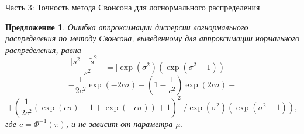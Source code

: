 \documentclass[ucs, notheorems, handout]{beamer}
\newtheorem{proposition2}[theorem]{Предложение}
\begin{document}
	\begin{frame}{Часть 3: Точность метода Свонсона для логнормального распределения}
		\begin{proposition2}\label{pr6}
			Ошибка аппроксимации дисперсии логнормального распределения по методу Свонсона, выведенному для аппроксимации нормального распределения, равна
			\[\dfrac{\mid s^{2} - \widetilde{s}^{2} \mid}{s^{2}} = \biggl|\exp(\sigma^{2})(\exp(\sigma^{2}-1)) -\]\[- \dfrac{1}{2c^{2}}\exp(-2c\sigma)- \left( 1- \dfrac{1}{c^{2}}\right) \exp(2c\sigma)+\]\[+ \left( \dfrac{1}{2c^{2}}(\exp(c\sigma)-1+\exp(-c\sigma)) + 1\right) ^{2}\biggr| /\exp(\sigma^{2})(\exp(\sigma^{2}-1)),\]
			где $c = \Phi^{-1}(\pi)$, и не зависит от параметра $\mu$.
			
			
		\end{proposition2}
	
	\end{frame}
	
\end{document}
